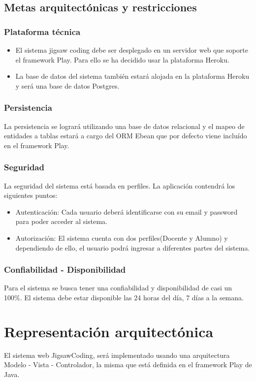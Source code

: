 \subsection{Metas arquitectónicas y restricciones}

\subsubsection{Plataforma técnica}
\begin{itemize}
	\item El sistema jigsaw coding debe ser desplegado en un servidor web que soporte el framework Play. Para ello se ha decidido usar la plataforma Heroku.
	\item La base de datos del sistema también estará alojada en la plataforma Heroku y será una base de datos Postgres.
\end{itemize}

\subsubsection{Persistencia}
La persistencia se logrará utilizando una base de datos relacional y el mapeo de entidades a tablas estará a cargo del ORM Ebean que por defecto viene incluído en el framework Play.

\subsubsection{Seguridad}
La seguridad del sistema está basada en perfiles. La aplicación contendrá los siguientes puntos:

\begin{itemize}
	\item Autenticación: Cada usuario deberá identificarse con su email y password para poder acceder al sistema.
	\item Autorización: El sistema cuenta con dos perfiles(Docente y Alumno) y dependiendo de ello, el usuario podrá ingresar a diferentes partes del sistema.
\end{itemize}

\subsubsection{Confiabilidad - Disponibilidad}
Para el sistema se busca tener una confiabilidad y disponibilidad de casi un 100\%. El sistema debe estar disponible las 24 horas del día, 7 días a la semana.

\section{Representación arquitectónica}
El sistema web JigsawCoding, será implementado usando una arquitectura Modelo - Vista - Controlador, la misma que está definida en el framework Play de Java.
